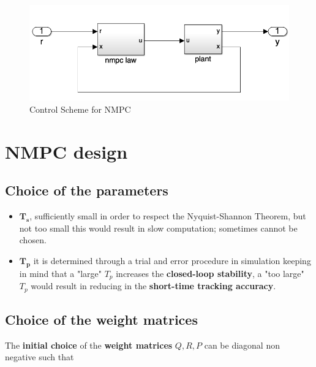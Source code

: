 \begin{figure}[h]
    \centering
    \includegraphics{NonLinearControl/images/NMPC_CtrlScheme.png}
    \caption{Control Scheme for NMPC}
    \label{fig:enter-label}
\end{figure}

\section{NMPC design}

\subsection{Choice of the parameters}
\begin{itemize}
    \item $\mathbf{T_s}$, sufficiently small in order to respect the Nyquist-Shannon Theorem, but not too small this would result in slow computation; sometimes cannot be chosen.
    \item $\mathbf{T_p}$ it is determined through a trial and error procedure in simulation keeping in mind that a "large" $T_p$ increases the \textbf{closed-loop stability}, a "too large" $T_p$ would result in reducing in the \textbf{short-time tracking accuracy}.
\end{itemize}

\subsection{Choice of the weight matrices}
The \textbf{initial choice} of the \textbf{weight matrices} $Q, R, P$ can be diagonal non negative  such that \\

